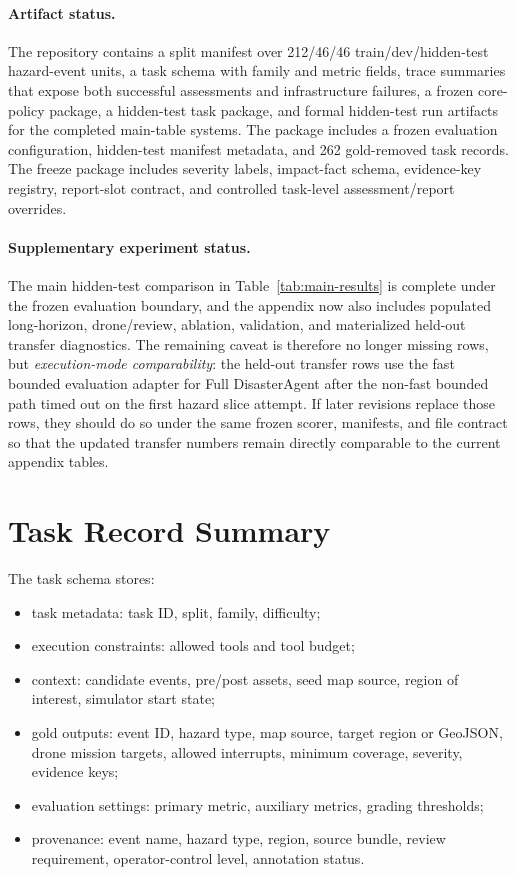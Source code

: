 \documentclass{article}
\begin{document}
\paragraph{Artifact status.}
The repository contains a split manifest over 212/46/46 train/dev/hidden-test hazard-event units, a task schema with family and metric fields, trace summaries that expose both successful assessments and infrastructure failures, a frozen core-policy package, a hidden-test task package, and formal hidden-test run artifacts for the completed main-table systems. The package includes a frozen evaluation configuration, hidden-test manifest metadata, and 262 gold-removed task records. The freeze package includes severity labels, impact-fact schema, evidence-key registry, report-slot contract, and controlled task-level assessment/report overrides.

\paragraph{Supplementary experiment status.}
The main hidden-test comparison in Table~\ref{tab:main-results} is complete under the frozen evaluation boundary, and the appendix now also includes populated long-horizon, drone/review, ablation, validation, and materialized held-out transfer diagnostics. The remaining caveat is therefore no longer missing rows, but \emph{execution-mode comparability}: the held-out transfer rows use the fast bounded evaluation adapter for Full DisasterAgent after the non-fast bounded path timed out on the first hazard slice attempt. If later revisions replace those rows, they should do so under the same frozen scorer, manifests, and file contract so that the updated transfer numbers remain directly comparable to the current appendix tables.

\section{Task Record Summary}

The task schema stores:
\begin{itemize}[leftmargin=1.2em]
    \item task metadata: task ID, split, family, difficulty;
    \item execution constraints: allowed tools and tool budget;
    \item context: candidate events, pre/post assets, seed map source, region of interest, simulator start state;
    \item gold outputs: event ID, hazard type, map source, target region or GeoJSON, drone mission targets, allowed interrupts, minimum coverage, severity, evidence keys;
    \item evaluation settings: primary metric, auxiliary metrics, grading thresholds;
    \item provenance: event name, hazard type, region, source bundle, review requirement, operator-control level, annotation status.
\end{itemize}
\end{document}
